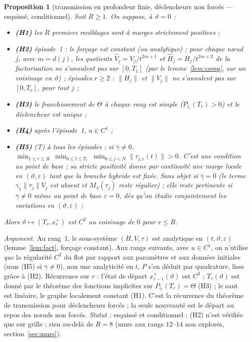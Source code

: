 \documentclass[11pt,a4paper]{article}
\newtheorem{proposition}{Proposition}
\theoremstyle{remark}
\newcommand{\vth}{\vartheta}
\begin{document}
\begin{proposition}[transmission en profondeur finie, d\'eclencheurs non forc\'es --- esquiss\'e, conditionnel]\label{prop:fini}
Soit $R\ge1$. On suppose, \`a $\vth=0$ :
\begin{itemize}[leftmargin=1.6em,itemsep=1pt]
\item \textbf{(H1)} les $R$ premiers recâblages sont \`a marges strictement positives ;
\item \textbf{(H2)} \emph{\'episode~1} : le for\c{c}age est constant (ou analytique) ; \emph{pour chaque n\oe ud $j$}, avec $m=d(j)$, les quotients $\hat V_j=V_j/t^{2m+1}$ et $\hat H_j=H_j/t^{2m+2}$ de la factorisation ne s'annulent pas sur $[0,T_1]$ (par le lemme~\ref{lem:comp}, sur un voisinage en $\vth$) ; \emph{\'episodes $r\ge2$} : $\lVert H_j\rVert$ et $\lVert V_j\rVert$ ne s'annulent pas sur $[0,T_r]$, pour tout $j$ ;
\item \textbf{(H3)} le franchissement de $\Theta$ \`a chaque rang est simple ($\dot P_{i_r}(T_r)>0$) et le d\'eclencheur est unique ;
\item \textbf{(H4)} apr\`es l'\'episode~1, $u\in C^1$ ;
\item \textbf{(H5)} (T) \`a \emph{tous} les \'episodes : si $\bar\gamma\neq0$, $\displaystyle\min_{1\le r\le R}\ \min_{0\le t\le T_r}\ \min_{0\le j<N}\lVert\tau_{j,r}(t)\rVert>0$. C'est une condition au point de base ; sa stricte positivit\'e donne par continuit\'e une marge locale en $(\vth,\varepsilon)$ tant que la branche hybride est fix\'ee. Sans objet si $\bar\gamma=0$ (le terme $\gamma_1\lVert\tau_j\rVert V_j$ est absent et $M_\lambda(\tau_j)$ reste r\'egulier) ; elle reste pertinente si $\bar\gamma\neq0$ m\^eme au point de base $\varepsilon=0$, d\`es qu'on \'etudie conjointement les variations en $(\vth,\varepsilon)$ ;
\end{itemize}
Alors $\vth\mapsto(T_r,x_r^+)$ est $C^2$ au voisinage de $0$ pour $r\le R$.
\end{proposition}
\noindent\emph{Argument.} Au rang~1, le sous-syst\`eme $(H,V,\tau)$ est analytique en $(t,\vth,\varepsilon)$ (lemme~\ref{lem:fact}, for\c{c}age constant). Aux rangs suivants, avec $u\in C^1$, on n'utilise \emph{que} la r\'egularit\'e $C^2$ du flot par rapport aux param\`etres et aux donn\'ees initiales (sous (H5) si $\bar\gamma\neq0$), non une analyticit\'e en $t$, $P$ s'en d\'eduit par quadrature, lisse gr\^ace \`a (H2). R\'ecurrence sur $r$ : l'\'etat de d\'epart $x_{r-1}^+(\vth)$ est $C^2$ ; $T_r(\vth)$ est donn\'e par le th\'eor\`eme des fonctions implicites sur $P_{i_r}(T_r)=\Theta$ (H3) ; le saut est lin\'eaire, le graphe localement constant (H1). C'est la r\'ecurrence du th\'eor\`eme de transmission pour d\'eclencheurs forc\'es ; la seule nouveaut\'e est le d\'epart au repos des n\oe uds non forc\'es. \emph{Statut :} esquiss\'e et conditionnel ; (H2) n'est v\'erifi\'ee que sur grille ; rien au-del\`a de $R=8$ (murs aux rangs $12$--$14$ non explor\'es, section~\ref{sec:murs}).
\end{document}
